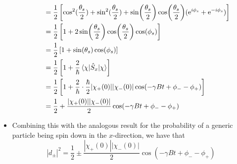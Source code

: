 \documentclass[../notes.tex]{subfiles}
\begin{document}
\begin{itemize}
\begin{itemize}
\begin{align*}
            &= \frac{1}{2}\left[ \cos^2(\frac{\theta_s}{2})+\sin^2(\frac{\theta_s}{2})+\sin(\frac{\theta_s}{2})\cos(\frac{\theta_s}{2})(\e[i\phi_s]+\e[-i\phi_s]) \right]\\
            &= \frac{1}{2}\left[ 1+2\sin(\frac{\theta_s}{2})\cos(\frac{\theta_s}{2})\cos(\phi_s) \right]\\
            &= \frac{1}{2}\left[ 1+\sin(\theta_s)\cos(\phi_s) \right]\\
            &= \frac{1}{2}\left[ 1+\frac{2}{\hbar}\ev{\hat{S}_x}{\chi} \right]\\
            &= \frac{1}{2}\left[ 1+\frac{2}{\hbar}\cdot\frac{\hbar}{2}|\chi_+(0)||\chi_-(0)|\cos(-\gamma Bt+\phi_--\phi_+) \right]\\
            &= \frac{1}{2}+\frac{|\chi_+(0)||\chi_-(0)|}{2}\cos(-\gamma Bt+\phi_--\phi_+)
        \end{align*}
    \end{itemize}
    \item Combining this with the analogous result for the probability of a generic particle being spin down in the $x$-direction, we have that
    \begin{equation*}
        |d_\pm|^2 = \frac{1}{2}\pm\frac{|\chi_+(0)||\chi_-(0)|}{2}\cos(-\gamma Bt+\phi_--\phi_+)
    \end{equation*}
\end{itemize}
\end{document}
